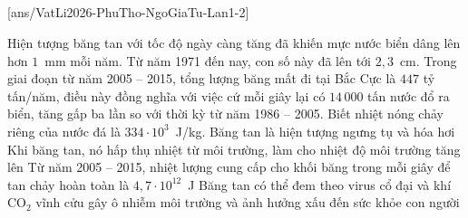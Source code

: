 	\subsection*{}
	\setcounter{ex}{0}
	[ans/VatLi2026-PhuTho-NgoGiaTu-Lan1-2]

	\begin{ex}%
		Hiện tượng băng tan với tốc độ ngày càng tăng đã khiến mực nước biển dâng lên hơn $1$~mm mỗi năm. Từ năm 1971 đến nay, con số này đã lên tới $2{,}3$~cm. Trong giai đoạn từ năm 2005 -- 2015, tổng lượng băng mất đi tại Bắc Cực là $447$ tỷ tấn/năm, điều này đồng nghĩa với việc cứ mỗi giây lại có $14\,000$ tấn nước đổ ra biển, tăng gấp ba lần so với thời kỳ từ năm 1986 -- 2005. Biết nhiệt nóng chảy riêng của nước đá là $334\cdot 10^3$~J/kg.
		\choiceTFt
		{Băng tan là hiện tượng ngưng tụ và hóa hơi}
		{Khi băng tan, nó hấp thụ nhiệt từ môi trường, làm cho nhiệt độ môi trường tăng lên}
		{\True Từ năm 2005 -- 2015, nhiệt lượng cung cấp cho khối băng trong mỗi giây để tan chảy hoàn toàn là $4{,}7\cdot 10^{12}$~J}
		{\True Băng tan có thể đem theo virus cổ đại và khí CO$_2$ vĩnh cửu gây ô nhiễm môi trường và ảnh hưởng xấu đến sức khỏe con người}
	\end{ex}

